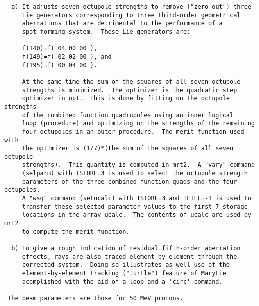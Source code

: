 \begin{footnotesize}
\begin{verbatim}
  a) It adjusts seven octupole strengths to remove ("zero out") three
     Lie generators corresponding to three third-order geometrical
     aberrations that are detrimental to the performance of a
     spot forming system.  These Lie generators are:

     f(140)=f( 04 00 00 ),
     f(149)=f( 02 02 00 ), and
     f(195)=f( 00 04 00 ).

     At the same time the sum of the squares of all seven octupole
     strengths is minimized.  The optimizer is the quadratic step
     optimizer in opt.  This is done by fitting on the octupole strengths
     of the combined function quadrupoles using an inner logical
     loop (procedure) and optimizing on the strengths of the remaining
     four octupoles in an outer procedure.  The merit function used with
     the optimizer is (1/7)*(the sum of the squares of all seven octupole
     strengths).  This quantity is computed in mrt2.  A "vary" command
     (selparm) with ISTORE=3 is used to select the octupole strength
     parameters of the three combined function quads and the four octupoles.
     A "wsq" command (setucalc) with ISTORE=3 and IFILE=-1 is used to
     transfer these selected parameter values to the first 7 storage
     locations in the array ucalc.  The contents of ucalc are used by mrt2
     to compute the merit function.

  b) To give a rough indication of residual fifth-order aberration
     effects, rays are also traced element-by-element through the
     corrected system.  Doing so illustrates as well use of the
     element-by-element tracking ("turtle") feature of MaryLie
     acomplished with the aid of a loop and a 'circ' command.

 The beam parameters are those for 50 MeV protons.


\end{verbatim}
\end{footnotesize}
